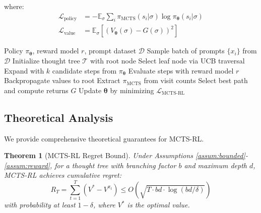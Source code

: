 \documentclass[11pt,a4paper]{article}
\newtheorem{theorem}{Theorem}[section]
\newcommand{\E}{\mathbb{E}}
\newcommand{\calL}{\mathcal{L}}
\newcommand{\calD}{\mathcal{D}}
\newcommand{\calT}{\mathcal{T}}
\newcommand{\btheta}{\bm{\theta}}
\begin{document}
where:
\begin{align}
    \calL_{\text{policy}} &= -\E_\sigma \sum_i \pi_{\text{MCTS}}(s_i|\sigma) \log \pi_\btheta(s_i|\sigma) \\
    \calL_{\text{value}} &= \E_\sigma \left[ (V_\btheta(\sigma) - G(\sigma))^2 \right]
\end{align}

\begin{algorithm}[t]
\caption{MCTS-RL Training}
\label{alg:mcts_rl}
\begin{algorithmic}[1]
\REQUIRE Policy $\pi_\btheta$, reward model $r$, prompt dataset $\calD$
    \STATE Sample batch of prompts $\{x_i\}$ from $\calD$
        \STATE Initialize thought tree $\calT$ with root node
            \STATE Select leaf node via UCB traversal
            \STATE Expand with $k$ candidate steps from $\pi_\btheta$
            \STATE Evaluate steps with reward model $r$
            \STATE Backpropagate values to root
        \ENDFOR
        \STATE Extract $\pi_{\text{MCTS}}$ from visit counts
        \STATE Select best path and compute returns $G$
    \ENDFOR
    \STATE Update $\btheta$ by minimizing $\calL_{\text{MCTS-RL}}$
\ENDFOR
\end{algorithmic}
\end{algorithm}

\subsection{Theoretical Analysis}

We provide comprehensive theoretical guarantees for MCTS-RL.

\begin{theorem}[MCTS-RL Regret Bound]
\label{thm:mcts_regret}
Under Assumptions \ref{assum:bounded}-\ref{assum:reward}, for a thought tree with branching factor $b$ and maximum depth $d$, MCTS-RL achieves cumulative regret:
\begin{equation}
    R_T = \sum_{t=1}^T (V^* - V^{\pi_t}) \leq O\left(\sqrt{T \cdot bd \cdot \log(bd/\delta)}\right)
\end{equation}
with probability at least $1-\delta$, where $V^*$ is the optimal value.
\end{theorem}
\end{document}
